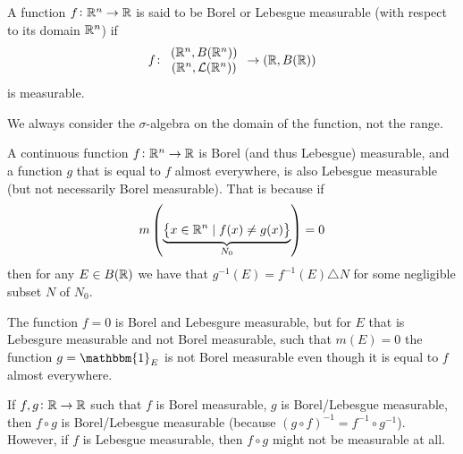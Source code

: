 \documentclass[11pt,a4paper]{article}
\begin{document}
\begin{definition}
  A function $f \colon \mathbb{R}^n \to \mathbb{R}$ is said to be Borel or Lebesgue measurable
  (with respect to its domain $\mathbb{R}^n$) if
  \[
    f \colon
    \begin{array}{c}
      (\mathbb{R}^n,B(\mathbb{R}^n)) \\
      (\mathbb{R}^n,\mathcal{L}(\mathbb{R}^n))
    \end{array}
    \to (\mathbb{R}, B(\mathbb{R}))
  \]
  is measurable.
\end{definition}
\begin{remark}
  We always consider the $\sigma$-algebra on the domain of the function,
  not the range.
\end{remark}

\begin{remark}
  A continuous function $f \colon \mathbb{R}^n \to \mathbb{R}$ is Borel (and thus Lebesgue)
  measurable, and a function $g$ that is equal to $f$ almost everywhere,
  is also Lebesgue measurable (but not necessarily Borel measurable).
  That is because if
  \[
    m\del{\underbrace{\set{x \in \R^n \mid f(x) \neq g(x)}}_{N_0}} = 0
  \]
  then for any $E \in B(\mathbb{R})$ we have that $g^{-1}(E) = f^{-1}(E) \triangle N$
  for some negligible subset $N$ of $N_0$.
\end{remark}

\begin{example}
  The function $f = 0$ is Borel and Lebesgure measurable,
  but for $E$ that is Lebesgure measurable and not Borel measurable,
  such that $m(E) = 0$
  the function $g = \mathbbm{1}_{E}$ is not Borel measurable even though
  it is equal to $f$ almost everywhere.
\end{example}

\begin{remark}
  If $f,g \colon \mathbb{R} \to \mathbb{R}$ such that $f$ is Borel measurable,
  $g$ is Borel/Lebesgue measurable,
  then $f \circ g$ is Borel/Lebesgue measurable
  (because $(g \circ f)^{-1} = f^{-1} \circ g^{-1}$).
  However, if $f$ is Lebesgue measurable,
  then $f \circ g$ might not be measurable at all.
\end{remark}
\end{document}
